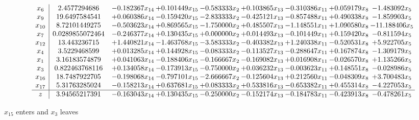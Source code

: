 \documentclass[10pt]{article}
\begin{document}
 \[\begin{array}{c| c c@{\hskip 2pt} c@{\hskip 2pt} c@{\hskip 2pt} c@{\hskip 2pt} c@{\hskip 2pt} c@{\hskip 2pt} c@{\hskip 2pt} }
 x_{6}   &  2.4577294686 & -0.182367 x_{14} & + 0.101449 x_{15} & -0.583333 x_{2} & + 0.103865 x_{13} & -0.310386 x_{11} & + 0.059179 x_{8} & -1.483092 x_{5}\\
 x_{9}   &  19.6497584541 & + 0.060386 x_{14} & -0.159420 x_{15} & -2.833333 x_{2} & -0.425121 x_{13} & -0.857488 x_{11} & + 0.490338 x_{8} & -1.859903 x_{5}\\
 x_{10}   &  8.72101449275 & -0.503623 x_{14} & + 0.869565 x_{15} & -1.750000 x_{2} & + 0.485507 x_{13} & -1.148551 x_{11} & + 1.090580 x_{8} & -11.188406 x_{5}\\
 x_{7}   &  0.0289855072464 & -0.246377 x_{14} & + 0.130435 x_{15} & + 0.000000 x_{2} & + 0.014493 x_{13} & -0.101449 x_{11} & + 0.159420 x_{8} & -0.811594 x_{5}\\
 x_{12}   &  13.443236715 & + 1.440821 x_{14} & -1.463768 x_{15} & -3.583333 x_{2} & -0.403382 x_{13} & + 1.240338 x_{11} & -0.520531 x_{8} & + 5.922705 x_{5}\\
 x_{4}   &  3.5229468599 & + 0.013285 x_{14} & + 0.144928 x_{15} & -0.083333 x_{2} & -0.113527 x_{13} & -0.288647 x_{11} & + 0.167874 x_{8} & -1.309179 x_{5}\\
 x_{1}   &  3.16183574879 & + 0.041063 x_{14} & -0.188406 x_{15} & -0.166667 x_{2} & -0.169082 x_{13} & + 0.016908 x_{11} & -0.026570 x_{8} & + 1.135266 x_{5}\\
 x_{3}   &  0.822463768116 & + 0.134058 x_{14} & -0.173913 x_{15} & -0.750000 x_{2} & + 0.036232 x_{13} & -0.003623 x_{11} & + 0.148551 x_{8} & -0.028986 x_{5}\\
 x_{16}   &  18.7487922705 & -0.198068 x_{14} & -0.797101 x_{15} & -2.666667 x_{2} & -0.125604 x_{13} & + 0.212560 x_{11} & -0.048309 x_{8} & + 3.700483 x_{5}\\
 x_{17}   &  5.31763285024 & -0.158213 x_{14} & + 0.637681 x_{15} & + 0.083333 x_{2} & + 0.533816 x_{13} & -0.653382 x_{11} & + 0.455314 x_{8} & -4.227053 x_{5}\\
\hline
z    &  3.94565217391 & -0.163043 x_{14} & + 0.130435 x_{15} & -0.250000 x_{2} & -0.152174 x_{13} & -0.184783 x_{11} & -0.423913 x_{8} & -0.478261 x_{5}\\
\end{array}\]


 $ x_{15} $ enters and $ x_{3} $ leaves 
\end{document}
